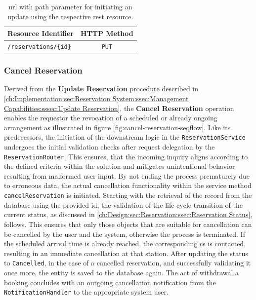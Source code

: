 \begingroup
\setlength{\tabcolsep}{10pt} %
\renewcommand{\arraystretch}{1.5} %
\begin{table}[h]
\centering
\caption{\acrshort{url} with path parameter for initiating an update using the respective \acrshort{rest} resource.}
    \begin{tabular}{l|c}
    Resource Identifier & HTTP Method \\ \hline
    \texttt{/reservations/\{id\}} & \texttt{PUT}
    \end{tabular}
\label{tab:update-reservation-rest}
\end{table}
\endgroup

\newpage

\subsubsection{Cancel Reservation}
\label{ch:Implementation:sec:Reservation System:ssec:Management Capabilities:sssec:Cancel Reservation}

Derived from the \textbf{Update Reservation} procedure described in \ref{ch:Implementation:sec:Reservation System:ssec:Management Capabilities:sssec:Update Reservation}, the \textbf{Cancel Reservation} operation enables the requestor the revocation of a scheduled or already ongoing arrangement as illustrated in figure \ref{fig:cancel-reservation-seqflow}.
Like its predecessors, the initiation of the downstream logic in the \texttt{ReservationService} undergoes the initial validation checks after request delegation by the \texttt{ReservationRouter}.
This ensures, that the incoming inquiry aligns according to the defined criteria within the solution and mitigates unintentional behavior resulting from malformed user input.
By not ending the process prematurely due to erroneous data, the actual cancellation functionality within the service method \texttt{cancelReservation} is initiated.
Starting with the retrieval of the record from the database using the provided \acrshort{id}, the validation of the life-cycle transition of the current status, as discussed in \ref{ch:Design:sec:Reservation:ssec:Reservation Status}, follows.
This ensures that only those objects that are suitable for cancellation can be cancelled by the user and the system, otherwise the process is terminated.
If the scheduled arrival time is already reached, the corresponding \acrshort{cs} is contacted, resulting in an immediate cancellation at that station.
After updating the status to \texttt{Cancelled}, in the case of a cancelled reservation, and successfully validating it once more, the entity is saved to the database again. The act of withdrawal a booking concludes with an outgoing cancellation notification from the \texttt{NotificationHandler} to the appropriate system user.

